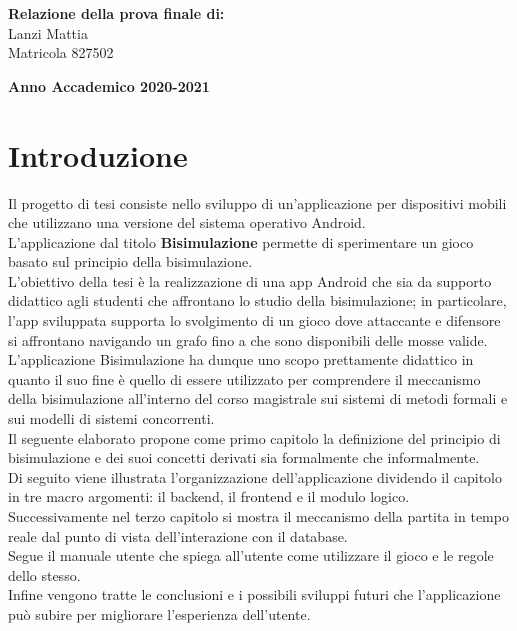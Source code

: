 \documentclass[a4paper,11pt,twoside,openright]{report}
\begin{document}
\begin{titlepage}
        \begin{flushright}
            {\large \textbf{Relazione della prova finale di:}} \\
            \large{Lanzi Mattia} \\
            \large{Matricola 827502} 
        \end{flushright}
        
        \vspace{40mm}
        \begin{center}
            {\large{\bf Anno Accademico 2020-2021}}
        \end{center}

        \restoregeometry
        
    \end{titlepage}

\tableofcontents

\chapter*{Introduzione}
Il progetto di tesi consiste nello sviluppo di un'applicazione per dispositivi mobili che utilizzano una versione del sistema operativo Android.\\
L'applicazione dal titolo \textbf{Bisimulazione} permette di sperimentare un gioco basato sul principio della bisimulazione.\\
L'obiettivo della tesi è la realizzazione di una app Android che sia da supporto didattico agli studenti che affrontano lo studio della bisimulazione; in particolare, l'app sviluppata supporta lo svolgimento di un gioco dove attaccante e difensore si affrontano navigando un grafo fino a che sono disponibili delle mosse valide.\\
L'applicazione Bisimulazione ha dunque uno scopo prettamente didattico in quanto il suo fine è quello di essere utilizzato per comprendere il meccanismo della bisimulazione all'interno del corso magistrale sui sistemi di metodi formali e sui modelli di sistemi concorrenti.\\
Il seguente elaborato propone come primo capitolo la definizione del principio di bisimulazione e dei suoi concetti derivati sia formalmente che informalmente.\\
Di seguito viene illustrata l'organizzazione dell'applicazione dividendo il capitolo in tre macro argomenti: il backend, il frontend e il modulo logico.\\ 
Successivamente nel terzo capitolo si mostra il meccanismo della partita in tempo reale dal punto di vista dell'interazione con il database.\\ 
Segue il manuale utente che spiega all'utente come utilizzare il gioco e le regole dello stesso.\\
Infine vengono tratte le conclusioni e i possibili sviluppi futuri che l'applicazione può subire per migliorare l'esperienza dell'utente.
\end{document}
